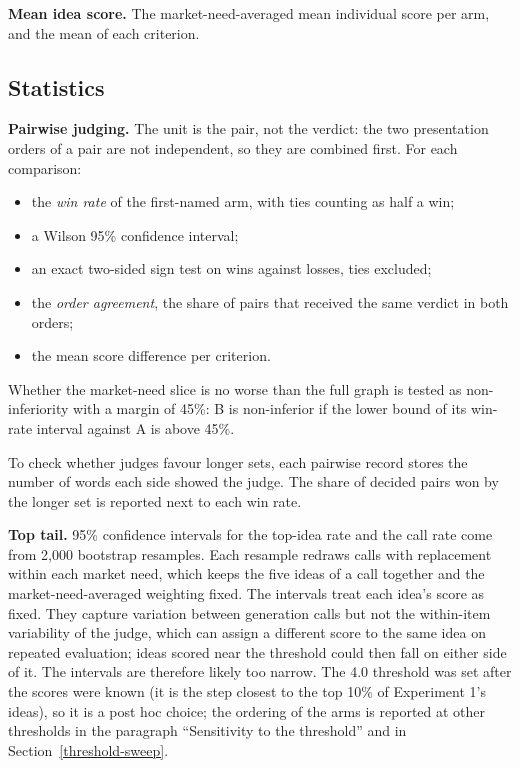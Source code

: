 \textbf{Mean idea score.} The market-need-averaged mean individual score per arm, and the mean of each criterion.

\hypertarget{statistics}{%
\subsection{Statistics}\label{statistics}}

\textbf{Pairwise judging.} The unit is the pair, not the verdict: the two presentation orders of a pair are not independent, so they are combined first. For each comparison:

\begin{itemize}
\tightlist
\item
  the \emph{win rate} of the first-named arm, with ties counting as half a win;
\item
  a Wilson 95\% confidence interval;
\item
  an exact two-sided sign test on wins against losses, ties excluded;
\item
  the \emph{order agreement}, the share of pairs that received the same verdict in both orders;
\item
  the mean score difference per criterion.
\end{itemize}

Whether the market-need slice is no worse than the full graph is tested as non-inferiority with a margin of 45\%: B is non-inferior if the lower bound of its win-rate interval against A is above 45\%.

To check whether judges favour longer sets, each pairwise record stores the number of words each side showed the judge. The share of decided pairs won by the longer set is reported next to each win rate.

\textbf{Top tail.} 95\% confidence intervals for the top-idea rate and the call rate come from 2,000 bootstrap resamples. Each resample redraws calls with replacement within each market need, which keeps the five ideas of a call together and the market-need-averaged weighting fixed. The intervals treat each idea's score as fixed. They capture variation between generation calls but not the within-item variability of the judge, which can assign a different score to the same idea on repeated evaluation; ideas scored near the threshold could then fall on either side of it. The intervals are therefore likely too narrow. The 4.0 threshold was set after the scores were known (it is the step closest to the top 10\% of Experiment 1's ideas), so it is a post hoc choice; the ordering of the arms is reported at other thresholds in the paragraph ``Sensitivity to the threshold'' and in Section~\ref{threshold-sweep}.

